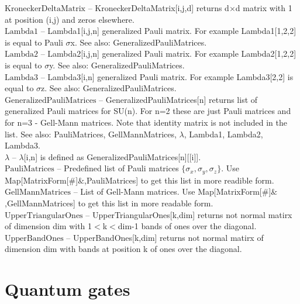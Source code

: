 \documentclass[a4paper,10pt]{scrartcl}
\begin{document}
\noindent\textbf{$ \text{KroneckerDeltaMatrix} $ }-- KroneckerDeltaMatrix[i,j,d] returns d$\times $d matrix with 1 at position (i,j) and zeros elsewhere.$  $\\[8pt]
\noindent\textbf{$ \text{Lambda1} $ }-- Lambda1[i,j,n] generalized Pauli matrix. For example Lambda1[1,2,2] is equal to Pauli $\sigma $x. See also: GeneralizedPauliMatrices.$  $\\[8pt]
\noindent\textbf{$ \text{Lambda2} $ }-- Lambda2[i,j,n] generalized Pauli matrix. For example Lambda2[1,2,2] is equal to $\sigma $y. See also: GeneralizedPauliMatrices.$  $\\[8pt]
\noindent\textbf{$ \text{Lambda3} $ }-- Lambda3[i,n] generalized Pauli matrix. For example Lambda3[2,2] is equal to $\sigma $z. See also: GeneralizedPauliMatrices.$  $\\[8pt]
\noindent\textbf{$ \text{GeneralizedPauliMatrices} $ }-- GeneralizedPauliMatrices[n] returns list of generalized Pauli matrices for SU(n). For n=2 these are just Pauli matrices and for n=3 - Gell-Mann matrices. Note that identity matrix is not included in the list. See also: PauliMatrices, GellMannMatrices, $\lambda $, Lambda1, Lambda2, Lambda3.$  $\\[8pt]
\noindent\textbf{$ \lambda  $ }-- $\lambda $[i,n] is defined as GeneralizedPauliMatrices[n][[i]].$  $\\[8pt]
\noindent\textbf{$ \text{PauliMatrices} $ }-- Predefined list of Pauli matrices $\{$$ \sigma _x,\sigma _y,\sigma _z $$\}$. Use Map[MatrixForm[$\#$]$\&$,PauliMatrices] to get this list in more readible form.$  $\\[8pt]
\noindent\textbf{$ \text{GellMannMatrices} $ }-- List of Gell-Mann matrices. Use Map[MatrixForm[$\#$]$\&$,GellMannMatrices] to get this list in more readable form.$  $\\[8pt]
\noindent\textbf{$ \text{UpperTriangularOnes} $ }-- UpperTriangularOnes[k,dim] returns not normal matirx of dimension dim with 1$<$k$<$dim-1 bands of ones over the diagonal.$  $\\[8pt]
\noindent\textbf{$ \text{UpperBandOnes} $ }-- UpperBandOnes[k,dim] returns not normal matirx of dimension dim with bands at position k of ones over the diagonal.$  $\\[8pt]
\section{Quantum gates}
\end{document}
